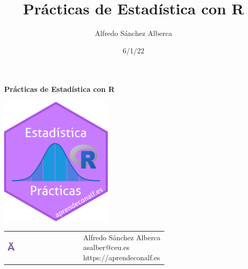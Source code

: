 \documentclass[
  a4paper,
]{scrreport}
\title{Prácticas de Estadística con R}
\author{Alfredo Sánchez Alberca}
\date{6/1/22}
\renewcommand*\contentsname{Tabla de contenidos}
\newcommand\contentsname{Tabla de contenidos}
\theoremstyle{definition}
\theoremstyle{remark}
\begin{document}
\begin{titlepage}

\begin{center}
\vspace*{5cm}

\Huge
{\textbf{\textsf{Prácticas de Estadística con R}}}

\vspace{0.5cm}
\LARGE
{\textbf{\textsf{}}}

\vspace{1.5cm}

\includegraphics[width=0.4\textwidth]{img/logos/sticker-estadistica-r.png}
\end{center}

\vfill

\begin{flushleft}
\begin{tabular}{ll}
\includegraphics[width=0.1\textwidth]{img/logos/aprendeconalf.png} & \parbox[b]{5cm}{\Large\textsf{Alfredo
Sánchez
Alberca}\\ \textsf{asalber@ceu.es} \\ \textsf{https://aprendeconalf.es}}
\end{tabular}
\end{flushleft}
\end{titlepage}\ifdefined\Shaded\renewenvironment{Shaded}{\begin{tcolorbox}[interior hidden, borderline west={3pt}{0pt}{shadecolor}, frame hidden, breakable, enhanced, boxrule=0pt, sharp corners]}{\end{tcolorbox}}\fi

\renewcommand*\contentsname{Tabla de contenidos}
{
\hypersetup{linkcolor=}
\setcounter{tocdepth}{2}
\tableofcontents
}
\end{document}
